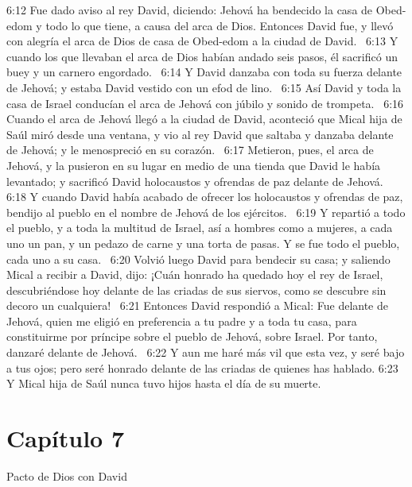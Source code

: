 6:12 Fue dado aviso al rey David, diciendo: Jehová ha bendecido la casa de Obed-edom y todo lo que tiene, a causa del arca de Dios. Entonces David fue, y llevó con alegría el arca de Dios de casa de Obed-edom a la ciudad de David.  
6:13 Y cuando los que llevaban el arca de Dios habían andado seis pasos, él sacrificó un buey y un carnero engordado.  
6:14 Y David danzaba con toda su fuerza delante de Jehová; y estaba David vestido con un efod de lino.  
6:15 Así David y toda la casa de Israel conducían el arca de Jehová con júbilo y sonido de trompeta.  
6:16 Cuando el arca de Jehová llegó a la ciudad de David, aconteció que Mical hija de Saúl miró desde una ventana, y vio al rey David que saltaba y danzaba delante de Jehová; y le menospreció en su corazón.  
6:17 Metieron, pues, el arca de Jehová, y la pusieron en su lugar en medio de una tienda que David le había levantado; y sacrificó David holocaustos y ofrendas de paz delante de Jehová.  
6:18 Y cuando David había acabado de ofrecer los holocaustos y ofrendas de paz, bendijo al pueblo en el nombre de Jehová de los ejércitos.  
6:19 Y repartió a todo el pueblo, y a toda la multitud de Israel, así a hombres como a mujeres, a cada uno un pan, y un pedazo de carne y una torta de pasas. Y se fue todo el pueblo, cada uno a su casa.  
6:20 Volvió luego David para bendecir su casa; y saliendo Mical a recibir a David, dijo: ¡Cuán honrado ha quedado hoy el rey de Israel, descubriéndose hoy delante de las criadas de sus siervos, como se descubre sin decoro un cualquiera!  
6:21 Entonces David respondió a Mical: Fue delante de Jehová, quien me eligió en preferencia a tu padre y a toda tu casa, para constituirme por príncipe sobre el pueblo de Jehová, sobre Israel. Por tanto, danzaré delante de Jehová.  
6:22 Y aun me haré más vil que esta vez, y seré bajo a tus ojos; pero seré honrado delante de las criadas de quienes has hablado. 
6:23 Y Mical hija de Saúl nunca tuvo hijos hasta el día de su muerte.  
\section*{Capítulo 7 }
Pacto de Dios con David  


